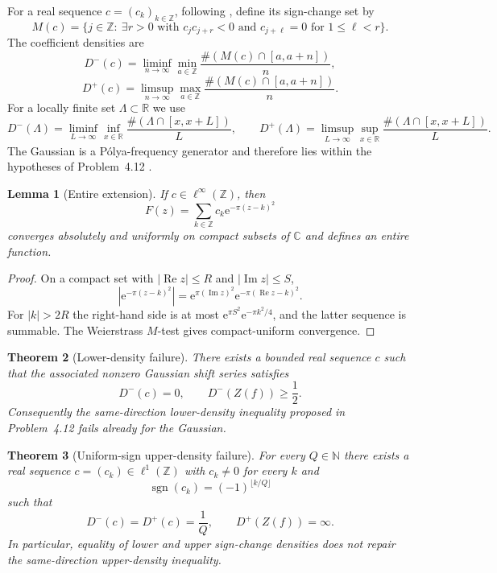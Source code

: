 \documentclass[11pt]{article}
\newtheorem{theorem}{Theorem}[section]
\newtheorem{lemma}[theorem]{Lemma}
\newcommand{\R}{\mathbb{R}}
\newcommand{\Z}{\mathbb{Z}}
\newcommand{\N}{\mathbb{N}}
\newcommand{\C}{\mathbb{C}}
\newcommand{\e}{\mathrm{e}}
\newcommand{\sgn}{\operatorname{sgn}}
\begin{document}
For a real sequence $c=(c_k)_{k\in\Z}$, following \cite{Grochenig2026}, define its sign-change set by
\[
 M(c)=\{j\in\Z:\ \exists r>0\text{ with }c_jc_{j+r}<0\text{ and }c_{j+\ell}=0\text{ for }1\le \ell<r\}.
\]
The coefficient densities are
\[
 D^-(c)=\liminf_{n\to\infty}\min_{a\in\Z}
 \frac{\#(M(c)\cap[a,a+n])}{n},
\]
\[
 D^+(c)=\limsup_{n\to\infty}\max_{a\in\Z}
 \frac{\#(M(c)\cap[a,a+n])}{n}.
\]
For a locally finite set $\Lambda\subset\R$ we use
\[
 D^-(\Lambda)=\liminf_{L\to\infty}\inf_{x\in\R}
 \frac{\#(\Lambda\cap[x,x+L])}{L},\qquad
 D^+(\Lambda)=\limsup_{L\to\infty}\sup_{x\in\R}
 \frac{\#(\Lambda\cap[x,x+L])}{L}.
\]
The Gaussian is a P\'olya-frequency generator and therefore lies within the hypotheses of Problem~4.12 \cite{Grochenig2026}.

\begin{lemma}[Entire extension]\label{lem:entire}
If $c\in\ell^\infty(\Z)$, then
\[
 F(z)=\sum_{k\in\Z}c_k\e^{-\pi(z-k)^2}
\]
converges absolutely and uniformly on compact subsets of $\C$ and defines an entire function.
\end{lemma}

\begin{proof}
On a compact set with $|\operatorname{Re}z|\le R$ and $|\operatorname{Im}z|\le S$,
\[
 \left|\e^{-\pi(z-k)^2}\right|
 =\e^{\pi(\operatorname{Im}z)^2}\e^{-\pi(\operatorname{Re}z-k)^2}.
\]
For $|k|>2R$ the right-hand side is at most $\e^{\pi S^2}\e^{-\pi k^2/4}$, and the latter sequence is summable. The Weierstrass $M$-test gives compact-uniform convergence.
\end{proof}

\begin{theorem}[Lower-density failure]\label{thm:lower}
There exists a bounded real sequence $c$ such that the associated nonzero Gaussian shift series satisfies
\[
 \boxed{D^-(c)=0,\qquad D^-(Z(f))\ge \frac12.}
\]
Consequently the same-direction lower-density inequality proposed in Problem~4.12 fails already for the Gaussian.
\end{theorem}

\begin{theorem}[Uniform-sign upper-density failure]\label{thm:upper}
For every $Q\in\N$ there exists a real sequence $c=(c_k)\in\ell^1(\Z)$ with $c_k\neq0$ for every $k$ and
\[
 \sgn(c_k)=(-1)^{\lfloor k/Q\rfloor}
\]
such that
\[
 \boxed{D^-(c)=D^+(c)=\frac1Q,\qquad D^+(Z(f))=\infty.}
\]
In particular, equality of lower and upper sign-change densities does not repair the same-direction upper-density inequality.
\end{theorem}
\end{document}
